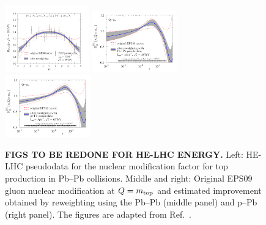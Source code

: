 \documentclass[../report.tex]{subfiles}
\begin{document}
\begin{figure}[ht]
\centering
\includegraphics[width=0.325\textwidth]{helhc/figs/data3.pdf}
\includegraphics[width=0.33\textwidth]{helhc/figs/gluons3.pdf}
\includegraphics[width=0.33\textwidth]{helhc/figs/gluons4.pdf}
\caption{{\bf FIGS TO BE REDONE FOR HE-LHC ENERGY.} Left: HE-LHC pseudodata for the nuclear modification factor for top production in Pb--Pb collisions. Middle and right: Original EPS09 gluon nuclear modification  at $Q=m_{\rm top}$ and 
  estimated improvement obtained by reweighting using the Pb--Pb (middle panel) and p--Pb (right panel). The figures are adapted from Ref.~\cite{dEnterria:2015mgr}.} 
\label{fig:tnPDF}
\end{figure}




\end{document}
